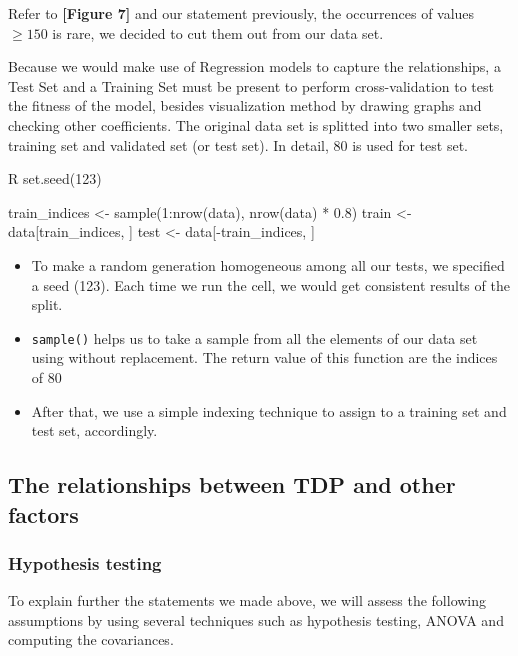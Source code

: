 Refer to \textbf{[Figure 7]} and our statement previously, the occurrences of values $\ge 150$ is rare, we decided to
cut them out from our data set.

Because we would make use of Regression models to capture the relationships, a Test Set and a Training Set must be present to perform 
cross-validation to test the fitness of the model, besides visualization method by drawing graphs and checking other coefficients. The original
data set is splitted into two smaller sets, training set and validated set (or test set). In detail, 80%
is used for test set.

\begin{code}{R}
set.seed(123)

train_indices <- sample(1:nrow(data), nrow(data) * 0.8)
train <- data[train_indices, ]
test <- data[-train_indices, ]
\end{code}

\begin{itemize}
    \item To make a random generation homogeneous among all our tests, we specified a seed (123). Each time we run the cell, we would get
    consistent results of the split.
    \item \verb|sample()| helps us to take a sample from all the elements of our data set using without replacement. The return value of this function
    are the indices of 80%
    \item After that, we use a simple indexing technique to assign to a training set and test set, accordingly.
\end{itemize}









\subsection{The relationships between TDP and other factors}
\subsubsection{Hypothesis testing}
\label{section:data_analysis_anova}

To explain further the statements we made above, we will assess the following assumptions by using several techniques such as 
hypothesis testing, ANOVA and computing the covariances.

